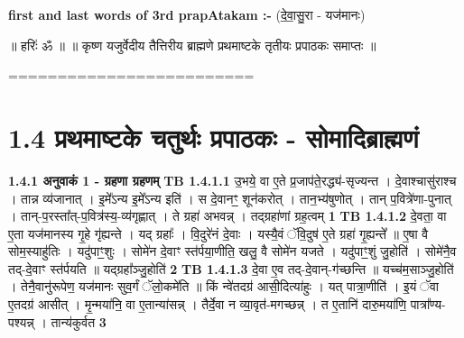 \documentclass[17pt]{extarticle}
\begin{document}
        \textbf{first and last  words of 3rd prapAtakam :-} \newline
        (दे॒वा॒सु॒रा - यज॑मानः) \newline 

       

        ॥ हरिः॑ ॐ ॥
॥ कृष्ण यजुर्वेदीय तैत्तिरीय ब्राह्मणे प्रथमाष्टके तृतीयः प्रपाठकः समाप्तः ॥

========================= \newline
        \pagebreak
        
        
        
     \section*{ 1.4     प्रथमाष्टके चतुर्थः प्रपाठकः - सोमादिब्राह्मणं }
                \textbf{ 1.4.1     अनुवाकं   1 - ग्रहणा ग्रहणम्} \newline
                                \textbf{ TB 1.4.1.1} \newline
                  उ॒भये॒ वा ए॒ते प्र॒जाप॑ते॒रद्ध्य॑-सृज्यन्त । दे॒वाश्चासु॑राश्च । तान्न व्य॑जानात् । इ॒मे᳚ऽन्य इ॒मे᳚ऽन्य इति॑ । स दे॒वानꣳ॒॒ शून॑करोत् । तान॒भ्य॑षुणोत् । तान् प॒वित्रे॑णा-पुनात् । तान्-प॒रस्ता᳚त्-प॒वित्र॑स्य॒-व्य॑गृह्णात् । ते ग्रहा॑ अभवन्न् । तद्ग्रहा॑णां ग्रह॒त्वम् \textbf{ 1} \newline
                  \newline
                                \textbf{ TB 1.4.1.2} \newline
                  दे॒वता॒ वा ए॒ता यज॑मानस्य गृ॒हे गृ॑ह्यन्ते । यद् ग्रहाः᳚ । वि॒दुरे॑नं दे॒वाः । यस्यै॒वं ॅवि॒दुष॑ ए॒ते ग्रहा॑ गृ॒ह्यन्ते᳚ ॥ ए॒षा वै सोम॒स्याहु॑तिः । यदु॑पाꣳ॒॒शुः । सोमे॑न दे॒वाꣳ स्त॑र्पया॒णीति॒ खलु॒ वै सोमे॑न यजते । यदु॑पाꣳ॒॒शुं जु॒होति॑ । सोमे॑नै॒व तद्-दे॒वाꣳ स्त॑र्पयति ॥ यद्ग्रहा᳚ञ्जु॒होति॑ \textbf{ 2} \newline
                  \newline
                                \textbf{ TB 1.4.1.3} \newline
                  दे॒वा ए॒व तद्-दे॒वान्-ग॑च्छन्ति ॥ यच्च॑म॒साञ्जु॒होति॑ । तेनै॒वानु॑रूपेण॒ यज॑मानः सुव॒र्गं ॅलो॒कमे॑ति ॥ किं न्वे॑तदग्र॑ आसी॒दित्या॑हुः । यत् पात्रा॒णीति॑ । इ॒यं ॅवा ए॒तदग्र॑ आसीत् । मृ॒न्मया॑नि॒ वा ए॒तान्या॑सन्न् । तैर्दे॒वा न व्या॒वृत॑-मगच्छन्न् । त ए॒तानि॑ दारु॒मया॑णि॒ पात्रा᳚ण्य-पश्यन्न् । तान्य॑कुर्वत \textbf{ 3} \newline
\end{document}
